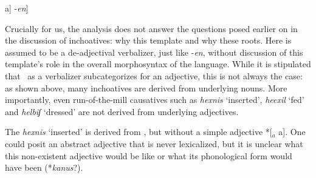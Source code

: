 \begin{exe}
\begin{xlist}
\begin{xlist}
\begin{exe}
\begin{exe}
\begin{xlist}
\begin{exe}
\begin{xlist}
\begin{exe}
\begin{xlist}
\begin{xlist}
\begin{exe}
\begin{xlist}
\begin{exe}
\begin{xlist}
\begin{exe}
\begin{exe}
\begin{exe}
\begin{xlist}
\begin{exe}
\begin{exe}
\begin{xlist}
\begin{xlist}
\begin{exe}
\begin{xlist}
\begin{exe}
\begin{exe}
\begin{exe}
\begin{xlist}
\begin{exe}
\begin{exe}
\begin{xlist}
\begin{exe}
\begin{xlist}
\begin{exe}
\begin{xlist}
\begin{exe}
\begin{xlist}
\begin{exe}
\begin{exe}
\begin{xlist}
\begin{exe}
\begin{exe}
\begin{xlist}
\begin{xlist}
\begin{exe}
\begin{xlist}
\begin{xlist}
\begin{exe}
\begin{xlist}
\begin{exe}
\begin{xlist}
\begin{exe}
\begin{xlist}
\begin{exe}
\begin{xlist}
\begin{exe}
\begin{exe}
\begin{exe}
\begin{exe}
\begin{xlist}
\begin{exe}
\begin{exe}
\begin{xlist}
\begin{xlist}
\begin{exe}
\begin{exe}
\begin{xlist}
\begin{exe}
\begin{xlist}
\begin{exe}
\begin{xlist}
\begin{exe}
\begin{xlist}
\begin{exe}
\begin{xlist}
\begin{exe}
\begin{exe}
 a] -\emph{en}] 
 \z 

Crucially for us, the analysis does not answer the questions posed earlier on in the discussion of inchoatives: why this template and why these roots. Here {\thif} is assumed to be a de-adjectival verbalizer, just like -\emph{en}, without discussion of this template's role in the overall morphosyntax of the language. While it is stipulated that \thif~as a verbalizer subcategorizes for an adjective, this is not always the case: as shown above, many inchoatives are derived from underlying nouns. More importantly, even run-of-the-mill causatives such as \emph{hexnis} `inserted', \emph{heexil} `fed' and \emph{helbiʃ} `dressed' are not derived from underlying adjectives.

The  \emph{hexnis} `inserted' is derived from , but without a simple adjective *[$_{a}$  a]. One could posit an abstract adjective that is never lexicalized, but it is unclear what this non-existent adjective would be like or what its phonological form would have been (*\emph{kanus}?).
 \begin{exe}
	
 \z 


\end{exe}
\end{exe}
\end{exe}
\end{xlist}
\end{exe}
\end{xlist}
\end{exe}
\end{xlist}
\end{exe}
\end{xlist}
\end{exe}
\end{xlist}
\end{exe}
\end{exe}
\end{xlist}
\end{xlist}
\end{exe}
\end{exe}
\end{xlist}
\end{exe}
\end{exe}
\end{exe}
\end{exe}
\end{xlist}
\end{exe}
\end{xlist}
\end{exe}
\end{xlist}
\end{exe}
\end{xlist}
\end{exe}
\end{xlist}
\end{xlist}
\end{exe}
\end{xlist}
\end{xlist}
\end{exe}
\end{exe}
\end{xlist}
\end{exe}
\end{exe}
\end{xlist}
\end{exe}
\end{xlist}
\end{exe}
\end{xlist}
\end{exe}
\end{xlist}
\end{exe}
\end{exe}
\end{xlist}
\end{exe}
\end{exe}
\end{exe}
\end{xlist}
\end{exe}
\end{xlist}
\end{xlist}
\end{exe}
\end{exe}
\end{xlist}
\end{exe}
\end{exe}
\end{exe}
\end{xlist}
\end{exe}
\end{xlist}
\end{exe}
\end{xlist}
\end{xlist}
\end{exe}
\end{xlist}
\end{exe}
\end{xlist}
\end{exe}
\end{exe}
\end{xlist}
\end{xlist}
\end{exe}

